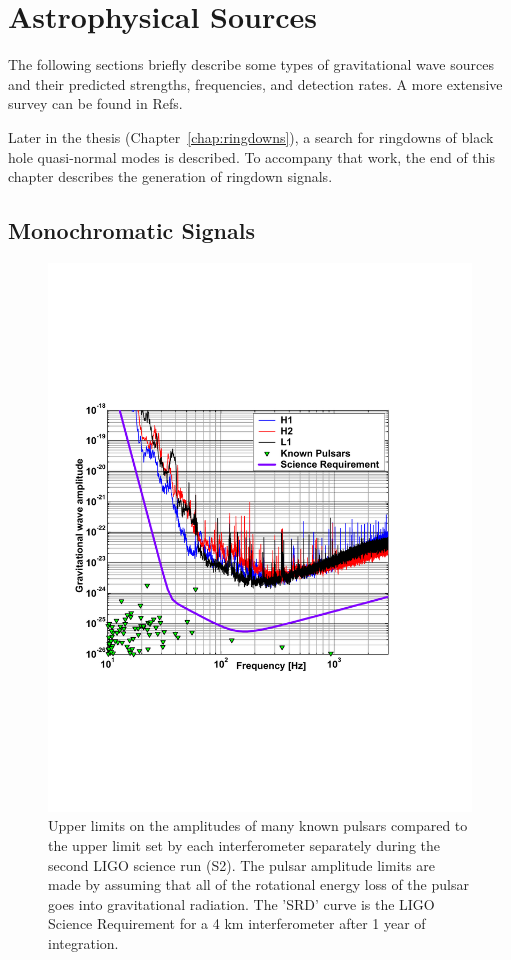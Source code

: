 \section{Astrophysical Sources}
\label{sec:Sources}

The following sections briefly describe some types of gravitational wave
sources and their predicted strengths, frequencies, and detection rates. 
A more extensive survey can be found in Refs.~\cite{Kip:300,Kip:Probing}

Later in the thesis (Chapter~\ref{chap:ringdowns}), a search for ringdowns of
black hole quasi-normal modes is described. To accompany that work, the end of 
this chapter describes the generation of ringdown signals.


\subsection{Monochromatic Signals}

\begin{figure}[!h]
\centerline{\includegraphics[angle=0,width=6.5in]{Figures/Chap1/pulsars.pdf}}
\caption[Known Pulsars]{Upper limits on the amplitudes of many known
         pulsars compared to the upper limit set by each 
         interferometer separately during the second LIGO science run (S2). The pulsar 
         amplitude limits are made by assuming that all of the
         rotational energy loss of the pulsar goes into gravitational radiation.
         The 'SRD' curve is the LIGO Science Requirement for a 4 km interferometer
         after 1 year of integration.}
\label{fig:pulsars}
\end{figure}

